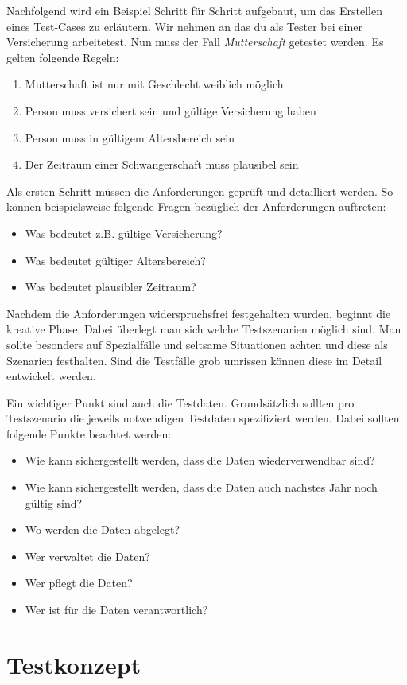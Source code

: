 Nachfolgend wird ein Beispiel Schritt für Schritt aufgebaut, um das Erstellen eines Test-Cases zu erläutern. Wir nehmen an das du als Tester bei einer Versicherung arbeitetest. Nun muss der Fall \textit{Mutterschaft} getestet werden. Es gelten folgende Regeln:
\begin{enumerate}
	\item Mutterschaft ist nur mit Geschlecht weiblich möglich
	\item Person muss versichert sein und gültige Versicherung haben
	\item  Person muss in gültigem Altersbereich sein
	\item Der Zeitraum einer Schwangerschaft muss plausibel sein
\end{enumerate}
Als ersten Schritt müssen die Anforderungen geprüft und detailliert werden. So können beispielsweise folgende Fragen bezüglich der Anforderungen auftreten:
\begin{itemize}
	\item Was bedeutet z.B. gültige Versicherung?
	\item Was bedeutet gültiger Altersbereich?
	\item Was bedeutet plausibler Zeitraum?
\end{itemize}
Nachdem die Anforderungen widerspruchsfrei festgehalten wurden, beginnt die kreative Phase. Dabei überlegt man sich welche Testszenarien möglich sind. Man sollte besonders auf Spezialfälle und seltsame Situationen achten und diese als Szenarien festhalten. Sind die Testfälle grob umrissen können diese im Detail entwickelt werden.

Ein wichtiger Punkt sind auch die Testdaten. Grundsätzlich sollten pro Testszenario die jeweils notwendigen Testdaten spezifiziert werden. Dabei sollten folgende Punkte beachtet werden:
\begin{itemize}
	\item Wie kann sichergestellt werden, dass die Daten wiederverwendbar sind?
	\item Wie kann sichergestellt werden, dass die Daten auch nächstes Jahr noch gültig sind?
	\item Wo werden die Daten abgelegt?
	\item Wer verwaltet die Daten?
	\item Wer pflegt die Daten?
	\item Wer ist für die Daten verantwortlich?
\end{itemize}

\section{Testkonzept}

